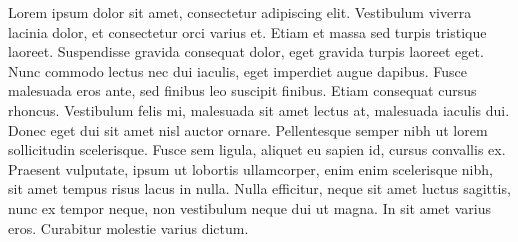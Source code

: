Lorem ipsum dolor sit amet, consectetur adipiscing elit. Vestibulum viverra
lacinia dolor, et consectetur orci varius et. Etiam et massa sed turpis
tristique laoreet. Suspendisse gravida consequat dolor, eget gravida turpis
laoreet eget. Nunc commodo lectus nec dui iaculis, eget imperdiet augue dapibus.
Fusce malesuada eros ante, sed finibus leo suscipit finibus. Etiam consequat
cursus rhoncus. Vestibulum felis mi, malesuada sit amet lectus at, malesuada
iaculis dui. Donec eget dui sit amet nisl auctor ornare. Pellentesque semper
nibh ut lorem sollicitudin scelerisque. Fusce sem ligula, aliquet eu sapien id,
cursus convallis ex. Praesent vulputate, ipsum ut lobortis ullamcorper, enim
enim scelerisque nibh, sit amet tempus risus lacus in nulla. Nulla efficitur,
neque sit amet luctus sagittis, nunc ex tempor neque, non vestibulum neque dui
ut magna. In sit amet varius eros. Curabitur molestie varius dictum.

